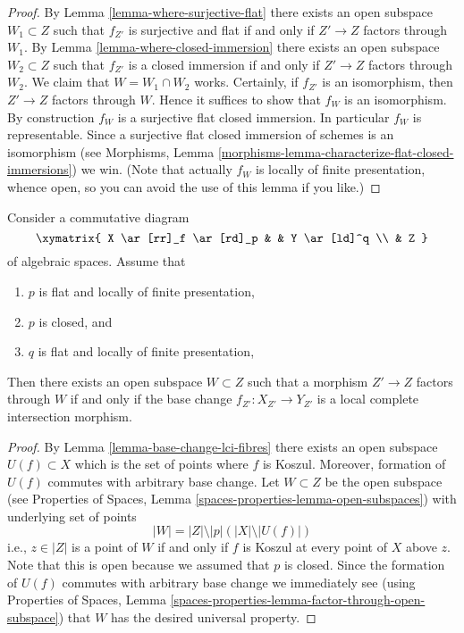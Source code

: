 \begin{proof}
By
Lemma \ref{lemma-where-surjective-flat}
there exists an open subspace $W_1 \subset Z$ such that
$f_{Z'}$ is surjective and flat if and only if $Z' \to Z$
factors through $W_1$. By
Lemma \ref{lemma-where-closed-immersion}
there exists an open subspace $W_2 \subset Z$ such that
$f_{Z'}$ is a closed immersion if and only if $Z' \to Z$
factors through $W_2$. We claim that $W = W_1 \cap W_2$ works.
Certainly, if $f_{Z'}$ is an isomorphism, then $Z' \to Z$
factors through $W$. Hence it suffices to show that
$f_W$ is an isomorphism. By construction $f_W$ is a
surjective flat closed immersion. In particular $f_W$ is
representable. Since a surjective flat closed immersion of
schemes is an isomorphism (see
Morphisms, Lemma \ref{morphisms-lemma-characterize-flat-closed-immersions})
we win. (Note that actually $f_W$ is locally of finite presentation,
whence open, so you can avoid the use of this lemma if you like.)
\end{proof}

\begin{lemma}
\label{lemma-where-lci}
Consider a commutative diagram
$$
\xymatrix{
X \ar[rr]_f \ar[rd]_p & & Y \ar[ld]^q \\
& Z
}
$$
of algebraic spaces. Assume that
\begin{enumerate}
\item $p$ is flat and locally of finite presentation,
\item $p$ is closed, and
\item $q$ is flat and locally of finite presentation,
\end{enumerate}
Then there exists an open subspace $W \subset Z$
such that a morphism $Z' \to Z$ factors through $W$ if and only if the
base change $f_{Z'} : X_{Z'} \to Y_{Z'}$ is a local complete intersection
morphism.
\end{lemma}

\begin{proof}
By Lemma \ref{lemma-base-change-lci-fibres}
there exists an open subspace $U(f) \subset X$ which is the set of
points where $f$ is Koszul. Moreover, formation of $U(f)$ commutes
with arbitrary base change. Let $W \subset Z$ be the open subspace
(see
Properties of Spaces, Lemma
\ref{spaces-properties-lemma-open-subspaces})
with underlying set of points
$$
|W| = |Z| \setminus |p|\left(|X| \setminus |U(f)|\right)
$$
i.e., $z \in |Z|$ is a point of $W$ if and only if $f$ is Koszul
at every point of $X$ above $z$. Note that this is open because we
assumed that $p$ is closed. Since the formation of $U(f)$
commutes with arbitrary base change we immediately see (using
Properties of Spaces, Lemma
\ref{spaces-properties-lemma-factor-through-open-subspace})
that $W$ has the desired universal property.
\end{proof}








